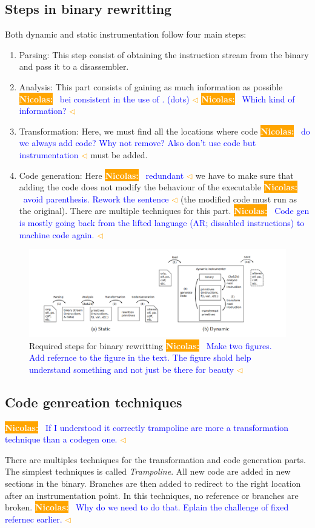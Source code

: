 \documentclass[a4paper,11pt,oneside]{report}
\newcommand{\todobox}[3]{%
	\colorbox{#1}{\textcolor{white}{\sffamily\bfseries\scriptsize #2}}%
	~\textcolor{blue}{#3} %
	\textcolor{#1}{$\triangleleft$}%
}
\newcommand{\nb}[1]{\todobox{orange}{Nicolas:}{#1}}
\begin{document}
\subsection{Steps in binary rewritting}
Both dynamic and static instrumentation follow four main steps:
\begin{enumerate}
    \item Parsing:
        This step consist of obtaining the instruction stream from the binary
        and pass it to a disassembler.
    \item Analysis:
        This part consists of gaining as much information as possible \nb{bei
        consistent in the use of . (dots)}\nb{Which kind of information?}
    \item Transformation:
        Here, we must find all the locations where  code \nb{do we always add
        code? Why not remove? Also don't use code but instrumentation}must be added. 
    \item Code generation:
        Here \nb{redundant} we have to make sure that adding the code does not modify the
        behaviour of the executable \nb{avoid parenthesis. Rework the sentence}(the modified code must run as the
        original). There are multiple techniques for this part. \nb{Code gen is
        mostly going back from the lifted language (AR; dissabled  instructions)
    to machine code again. }
\end{enumerate}
\begin{figure}[h]
    \includegraphics[width=\linewidth]{required_steps.png} 
    \caption{Required steps for binary rewritting\nb{Make two figures. Add
    refernce to the figure in the text. The figure shold help understand
    something and not just be there for beauty}}
    \label{fig:steps}
  \end{figure}
\subsection{Code genreation techniques}
\nb{If I understood it correctly trampoline are  more a transformation technique than a codegen one.}
There are multiples techniques for the transformation and code generation
parts. The simplest techniques is called \textit{Trampoline}. All new code are
added in new sections in the binary. Branches are then added to redirect to the
right location after an instrumentation point. In this techniques, no reference
or branches are broken. \nb{Why do we need to do that. Eplain the challenge of
fixed refernec earlier.}
\end{document}
